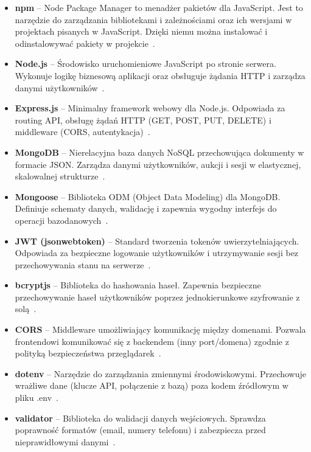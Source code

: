 \begin{itemize}
  \item \textbf{npm} -- Node Package Manager to menadżer pakietów dla JavaScript. Jest to narzędzie do zarządzania bibliotekami i zależnościami oraz ich wersjami w projektach pisanych w JavaScript. Dzięki niemu można instalować i odinstalowywać pakiety w projekcie~\cite{npm}.
  \item \textbf{Node.js} -- Środowisko uruchomieniowe JavaScript po stronie serwera. Wykonuje logikę biznesową aplikacji oraz obsługuje żądania HTTP i zarządza danymi użytkowników~\cite{nodejs}.
  \item \textbf{Express.js} -- Minimalny framework webowy dla Node.js. Odpowiada za routing API, obsługę żądań HTTP (GET, POST, PUT, DELETE) i middleware (CORS, autentykacja)~\cite{expressjs}.
  \item \textbf{MongoDB} -- Nierelacyjna baza danych NoSQL przechowująca dokumenty w formacie JSON. Zarządza danymi użytkowników, aukcji i sesji w elastycznej, skalowalnej strukturze~\cite{mongodb}.
  \item \textbf{Mongoose} -- Biblioteka ODM (Object Data Modeling) dla MongoDB. Definiuje schematy danych, walidację i zapewnia wygodny interfejs do operacji bazodanowych~\cite{mongoose}.
  \item \textbf{JWT (jsonwebtoken)} -- Standard tworzenia tokenów uwierzytelniających. Odpowiada za bezpieczne logowanie użytkowników i utrzymywanie sesji bez przechowywania stanu na serwerze~\cite{jwt}.
  \item \textbf{bcryptjs} -- Biblioteka do hashowania haseł. Zapewnia bezpieczne przechowywanie haseł użytkowników poprzez jednokierunkowe szyfrowanie z solą~\cite{bcrypt}.
  \item \textbf{CORS} -- Middleware umożliwiający komunikację między domenami. Pozwala frontendowi komunikować się z backendem (inny port/domena) zgodnie z polityką bezpieczeństwa przeglądarek~\cite{cors}.
  \item \textbf{dotenv} -- Narzędzie do zarządzania zmiennymi środowiskowymi. Przechowuje wrażliwe dane (klucze API, połączenie z bazą) poza kodem źródłowym w pliku .env~\cite{dotenv}.
  \item \textbf{validator} -- Biblioteka do walidacji danych wejściowych. Sprawdza poprawność formatów (email, numery telefonu) i zabezpiecza przed nieprawidłowymi danymi~\cite{validator}.
\end{itemize}


